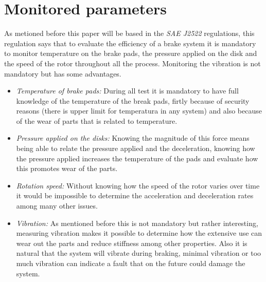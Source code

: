 \section{Monitored parameters}
As metioned before this paper will be based in the \textit{SAE J2522} regulations, this regulation says that to evaluate the efficiency of a brake system it is mandatory to monitor temperature on the brake pads, the pressure applied on the disk and the speed of the rotor throughout all the process. Monitoring the vibration is not mandatory but has some advantages.

\begin{itemize}
	\item\textit{Temperature of brake pads: } During all test it is mandatory to have full knowledge of the temperature of the break pads, firtly because of security reasons (there is upper limit for temperatura in any system) and also because of the wear of parts that is related to temperature.
	\item\textit{Pressure applied on the disks: } Knowing the magnitude of this force means being able to relate the pressure applied and the deceleration, knowing how the pressure applied increases the temperature of the pads and evaluate how this promotes wear of the parts.
	\item\textit{Rotation speed: } Without knowing how the speed of the rotor varies over time it would be impossible to determine the acceleration and deceleration rates among many other issues.
	\item\textit{Vibration: } As mentioned before this is not mandatory but rather interesting, measuring vibration makes it possible to determine how the extensive use can wear out the parts and reduce stiffness among other properties. Also it is natural that the system will vibrate during braking, minimal vibration or too much vibration can indicate a fault that on the future could damage the system.
\end{itemize}
